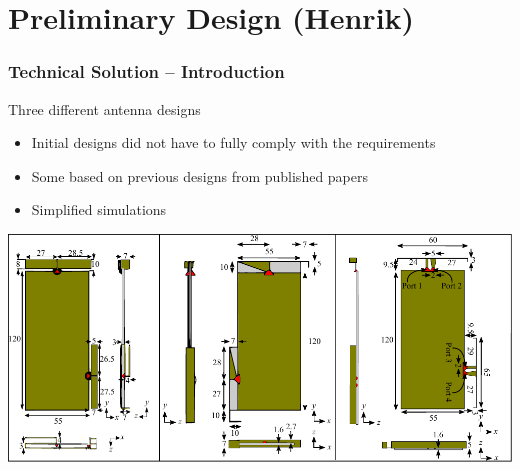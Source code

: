 \section[Preliminary Design] {Preliminary Design (Henrik)}
\begin{frame}
    \frametitle{Technical Solution -- Introduction}
    \begin{block}{Three different antenna designs}
      \begin{itemize}
      \item Initial designs did not have to fully comply with the requirements
      \item Some based on previous designs from published papers
      \item Simplified simulations
      \end{itemize}
    \end{block}
\vspace*{-0.5cm}
  \begin{center} 
    \includegraphics[width=\textwidth]{img/henrik/all_td}%

  \end{center}
\end{frame}


